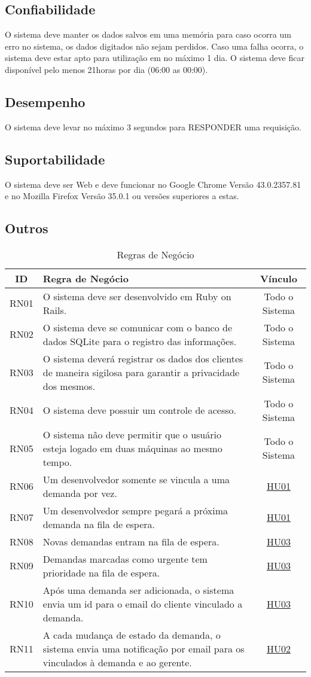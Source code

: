 \subsection{Confiabilidade}

O sistema deve manter os dados salvos em uma memória para caso ocorra um erro no sistema, os dados digitados não sejam perdidos.
Caso uma falha ocorra, o sistema deve estar apto para utilização em no máximo 1 dia.
O sistema deve ficar disponível pelo menos 21horas por dia (06:00 as 00:00).

\subsection{Desempenho}

O sistema deve levar no máximo 3 segundos para RESPONDER uma requisição.

\subsection{Suportabilidade}

O sistema deve ser Web e deve funcionar no Google Chrome Versão
43.0.2357.81 e no Mozilla Firefox Versão 35.0.1 ou versões superiores a estas.

\subsection{Outros}

\begin{table}[H]
	\begin{tabular}{|c|>{\centering}p{12cm}|c|}
		\hline
		ID & Regra de Negócio & Vínculo\tabularnewline
		\hline
		\hline
		RN01 & O sistema deve ser desenvolvido em Ruby on Rails. & Todo o Sistema\tabularnewline
		\hline
		RN02 & O sistema deve se comunicar com o banco de dados SQLite para o registro
		das informações. & Todo o Sistema\tabularnewline
		\hline
		RN03 & O sistema deverá registrar os dados dos clientes de maneira sigilosa
		para garantir a privacidade dos mesmos. & Todo o Sistema\tabularnewline
		\hline
		RN04 & O sistema deve possuir um controle de acesso. & Todo o Sistema\tabularnewline
		\hline
		RN05 & O sistema não deve permitir que o usuário esteja logado em duas máquinas
		ao mesmo tempo. & Todo o Sistema\tabularnewline
		\hline
		RN06 & Um desenvolvedor somente se vincula a uma demanda por vez. & \hyperref[HU01]{HU01}\tabularnewline
		\hline
		RN07 & Um desenvolvedor sempre pegará a próxima demanda na fila de espera. & \hyperref[HU01]{HU01}\tabularnewline
		\hline
		RN08 & Novas demandas entram na fila de espera. & \hyperref[HU03]{HU03}\tabularnewline
		\hline
		RN09 & Demandas marcadas como urgente tem prioridade na fila de espera. & \hyperref[HU03]{HU03}\tabularnewline
		\hline
		RN10 & Após uma demanda ser adicionada, o sistema envia um id para o email
		do cliente vinculado a demanda. & \hyperref[HU03]{HU03}\tabularnewline
		\hline
		RN11 & A cada mudança de estado da demanda, o sistema envia uma notificação
		por email para os vinculados à demanda e ao gerente. & \hyperref[HU02]{HU02}\tabularnewline
		\hline
	\end{tabular}
	\caption{Regras de Negócio}
	\label{Regra_de_Negocio}
\end{table}
